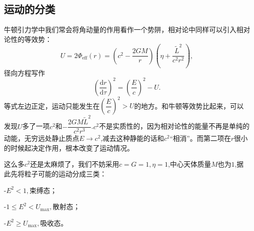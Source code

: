 \documentclass[11pt, a4paper, oneside, onecolumn]{ctexart}
\numberwithin{equation}{subsection}
\begin{document}
\subsection{运动的分类}
牛顿引力学中我们常会将角动量的作用看作一个势阱，相对论中同样可以引入相对论性的等效势：
\begin{equation}
U=2\Phi_{\text{eff}}\left(r\right)=\left(c^{2}-\frac{2GM}{r}\right)\left(\eta+\frac{\widetilde{L}^{2}}{c^{2}r^{2}}\right),
\end{equation}
径向方程写作
\begin{equation}
\left(\frac{\mathrm{d}r}{\mathrm{d}\tau}\right)^{2}=\left(\frac{E}{c}\right)^{2}-U.
\end{equation}
等式左边正定，运动只能发生在$\left(\dfrac{E}{c}\right)^{2}>U$的地方。和牛顿等效势比起来，可以发现$U$多了一项$c^{2}$和$-\dfrac{2GM\widetilde{L}^{2}}{c^{2}r^{3}}$.$c^{2}$不是实质性的，因为相对论性的能量不再是单纯的动能，无穷远处静止质点$E\to c^{2}$,减去这种静能的话和$c^{2}$“相消”。而第二项在$r$很小的时候起决定作用，根本改变了运动情况。

这么多$c^{2}$还是太麻烦了，我们不妨采用$c=G=1,\eta=1$,中心天体质量$M$也为$1$,据此先将粒子可能的运动分成三类：

\quad-\quad $E^{2}<1,$束缚态；

\quad-\quad $1\le E^{2}<U_{\max},$散射态；

\quad-\quad $E^{2}\ge U_{\max},$吸收态。
\end{document}
